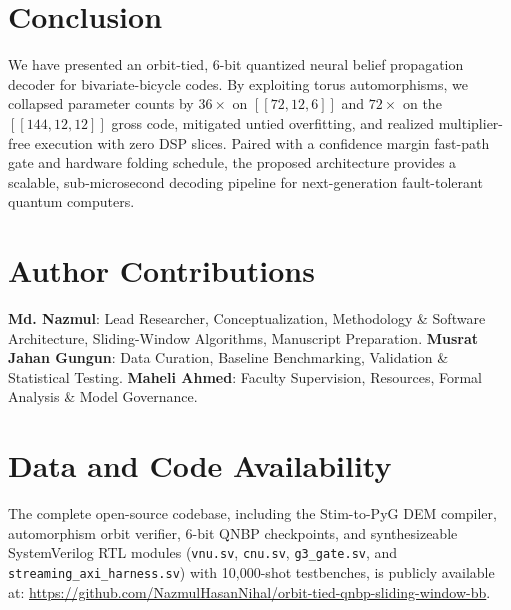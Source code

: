 \documentclass[journal]{IEEEtran}
\begin{document}
\section{Conclusion}
We have presented an orbit-tied, 6-bit quantized neural belief propagation decoder for bivariate-bicycle codes. By exploiting torus automorphisms, we collapsed parameter counts by $36\times$ on $[[72,12,6]]$ and $72\times$ on the $[[144,12,12]]$ gross code, mitigated untied overfitting, and realized multiplier-free execution with zero DSP slices. Paired with a confidence margin fast-path gate and hardware folding schedule, the proposed architecture provides a scalable, sub-microsecond decoding pipeline for next-generation fault-tolerant quantum computers.

\section*{Author Contributions}
\textbf{Md. Nazmul}: Lead Researcher, Conceptualization, Methodology \& Software Architecture, Sliding-Window Algorithms, Manuscript Preparation. \textbf{Musrat Jahan Gungun}: Data Curation, Baseline Benchmarking, Validation \& Statistical Testing. \textbf{Maheli Ahmed}: Faculty Supervision, Resources, Formal Analysis \& Model Governance.

\section*{Data and Code Availability}
The complete open-source codebase, including the Stim-to-PyG DEM compiler, automorphism orbit verifier, 6-bit QNBP checkpoints, and synthesizeable SystemVerilog RTL modules (\texttt{vnu.sv}, \texttt{cnu.sv}, \texttt{g3\_gate.sv}, and \texttt{streaming\_axi\_harness.sv}) with 10,000-shot testbenches, is publicly available at: \url{https://github.com/NazmulHasanNihal/orbit-tied-qnbp-sliding-window-bb}.

\balance


\end{document}
